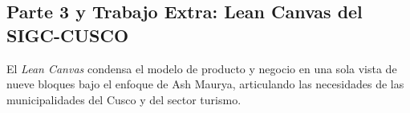 
\clearpage
\begin{landscape}
\thispagestyle{fancy}
\begin{singlespace}
\section{Parte 3 y Trabajo Extra: Lean Canvas del SIGC-CUSCO}

\noindent\small El \textit{Lean Canvas} condensa el modelo de producto y negocio en una sola vista de nueve bloques bajo el enfoque de Ash Maurya, articulando las necesidades de las municipalidades del Cusco y del sector turismo.


\end{singlespace}
\end{landscape}
